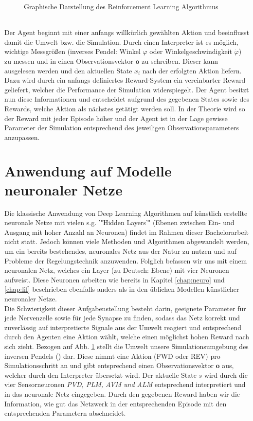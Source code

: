 	\begin{figure}[!h] %
		\centering
		\def\svgwidth{12cm}
		
		\caption{Graphische Darstellung des Reinforcement Learning Algorithmus}
		\label{fig:rl_chart}
	\end{figure}\\
	Der Agent beginnt mit einer anfangs willkürlich gewählten Aktion und beeinflusst damit die Umwelt bzw. die Simulation. Durch einen Interpreter ist es möglich, wichtige Messgrößen (inverses Pendel: Winkel $\varphi$ oder Winkelgeschwindigkeit $\dot{\varphi}$) zu messen und in einen Observationsvektor $\textbf{o}$ zu schreiben. Dieser kann ausgelesen werden und den aktuellen State $x_i$ nach der erfolgten Aktion liefern. Dazu wird durch ein anfangs definiertes Reward-System ein vereinbarter Reward geliefert, welcher die Performance der Simulation widerspiegelt. Der Agent besitzt nun diese Informationen und entscheidet aufgrund des gegebenen States sowie des Rewards, welche Aktion als nächstes getätigt werden soll. In der Theorie wird so der Reward mit jeder Episode höher und der Agent ist in der Lage gewisse Parameter der Simulation entsprechend des jeweiligen Observationsparameters anzupassen.
	
\section{Anwendung auf Modelle neuronaler Netze}
\label{sec:rl_neuro}
	Die klassische Anwendung von Deep Learning Algorithmen auf künstlich erstellte neuronale Netze mit vielen s.g. '"Hidden Layers'" (Ebenen zwischen Ein- und Ausgang mit hoher Anzahl an Neuronen) findet im Rahmen dieser Bachelorarbeit nicht statt. Jedoch können viele Methoden und Algorithmen abgewandelt werden, um ein bereits bestehendes, neuronales Netz aus der Natur zu nutzen und auf Probleme der Regelungstechnik anzuwenden. Folglich befassen wir uns mit einem neuronalen Netz, welches ein Layer (zu Deutsch: Ebene) mit vier Neuronen aufweist. Diese Neuronen arbeiten wie bereits in Kapitel \ref{chap:neuro} und \ref{chap:lif} beschrieben ebenfalls anders als in den üblichen Modellen künstlicher neuronaler Netze.\\
	Die Schwierigkeit dieser Aufgabenstellung besteht darin, geeignete Parameter für jede Nervenzelle sowie für jede Synapse zu finden, sodass das Netz korrekt und zuverlässig auf interpretierte Signale aus der Umwelt reagiert und entsprechend durch den Agenten eine Aktion wählt, welche einen möglichst hohen Reward nach sich zieht. Bezogen auf Abb. \ref{fig:rl_chart} stellt die Umwelt unsere Simulationsumgebung des inversen Pendels () dar. Diese nimmt eine Aktion (FWD oder REV) pro Simulationsschritt an und gibt entsprechend einen Observationsvektor $\textbf{o}$ aus, welcher durch den Interpreter übersetzt wird. Der aktuelle State $s$ wird durch die vier Sensorneuronen \textit{PVD, PLM, AVM und ALM} entsprechend interpretiert und in das neuronale Netz eingegeben. Durch den gegebenen Reward haben wir die Information, wie gut das Netzwerk in der entsprechenden Episode mit den entsprechenden Parametern abschneidet.

